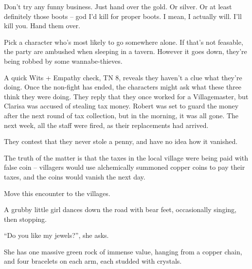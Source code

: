 \begin{multicols}{2}

\begin{speechtext}

	Don't try any funny business.  Just hand over the gold. Or silver.  Or at least definitely those boots -- god I'd kill for proper boots.  I mean, I actually will.  I'll kill you.  Hand them over.

\end{speechtext}

Pick a character who's most likely to go somewhere alone.  If that's not feasable, the party are ambushed when sleeping in a tavern.  However it goes down, they're being robbed by some wannabe-thieves.

A quick Wits + Empathy check, TN 8, reveals they haven't a clue what they're doing.  Once the non-fight has ended, the characters might ask what these three think they were doing.  They reply that they once worked for a Villagemaster, but Clarisa was accused of stealing tax money.  Robert was set to guard the money after the next round of tax collection, but in the morning, it was all gone.  The next week, all the staff were fired, as their replacements had arrived.

They contest that they never stole a penny, and have no idea how it vanished.

The truth of the matter is that the taxes in the local village were being paid with false coin -- villagers would use alchemically summoned copper coins to pay their taxes, and the coins would vanish the next day.


\humanthief


\humanthief

Move this encounter to the villages.


\begin{boxtext}
	A grubby little girl dances down the road with bear feet, occasionally singing, then stopping.

		``Do you like my jewels?'', she asks.

	She has one massive green rock of immense value, hanging from a copper chain, and four bracelets on each arm, each studded with crystals.
\end{boxtext}


\end{multicols}
